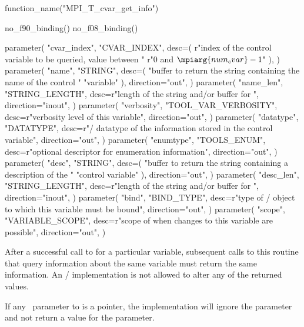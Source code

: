 \begin{mpi-binding}
    function_name("MPI_T_cvar_get_info")
    
    no_f90_binding()
    no_f08_binding()
    
    parameter(
        "cvar_index",
        "CVAR_INDEX",
        desc=(
            r"index of the control variable to be queried, value between "
            r"$0$ and $\mpiarg{num_cvar}-1$"
        ),
    )
    parameter(
        "name",
        "STRING",
        desc=(
            "buffer to return the string containing the name of the control "
            "variable"
        ),
        direction="out",
    )
    parameter(
        "name_len",
        "STRING_LENGTH",
        desc=r"length of the string and/or buffer for ",
        direction="inout",
    )
    parameter(
        "verbosity",
        "TOOL_VAR_VERBOSITY",
        desc=r"verbosity level of this variable",
        direction="out",
    )
    parameter(
        "datatype",
        "DATATYPE",
        desc=r"\mpi/ datatype of the information stored in the control variable",
        direction="out",
    )
    parameter(
        "enumtype",
        "TOOLS_ENUM",
        desc=r"optional descriptor for enumeration information",
        direction="out",
    )
    parameter(
        "desc",
        "STRING",
        desc=(
            "buffer to return the string containing a description of the "
            "control variable"
        ),
        direction="out",
    )
    parameter(
        "desc_len",
        "STRING_LENGTH",
        desc=r"length of the string and/or buffer for ",
        direction="inout",
    )
    parameter(
        "bind",
        "BIND_TYPE",
        desc=r"type of \mpi/ object to which this variable must be bound",
        direction="out",
    )
    parameter(
        "scope",
        "VARIABLE_SCOPE",
        desc=r"scope of when changes to this variable are possible",
        direction="out",
    )
\end{mpi-binding}

After a successful call to  for a
particular variable, subsequent calls to this routine that query
information about the same variable must return the same information.  An
\MPI/ implementation is not allowed to alter any of the returned values.

If any \OUT\ parameter to  is a
 pointer, the implementation will ignore the parameter and not
return a value for the parameter.


